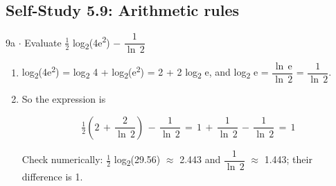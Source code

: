\documentclass[11pt]{article}
\begin{document}
\begin{keepsection}\subsection{Self-Study 5.9: Arithmetic rules}

\begin{workedbox}{9a \ensuremath{\cdot} Evaluate \ensuremath{\tfrac12} log\textsubscript{2}(4e\textsuperscript{2}) \ensuremath{-} {\small\ensuremath{\dfrac{1}{\ln \, 2}}}}
\begin{enumerate}
\item log\textsubscript{2}(4e\textsuperscript{2}) = log\textsubscript{2} 4 + log\textsubscript{2}(e\textsuperscript{2}) = 2 + 2 log\textsubscript{2} e, and log\textsubscript{2} e = {\small\ensuremath{\dfrac{\ln \, \mathrm{e}}{\ln \, 2}}} = {\small\ensuremath{\dfrac{1}{\ln \, 2}}}.
\item {}
So the expression is

\begin{equation*}\tfrac{1}{2}\left(2\, +\, \dfrac{2}{\ln \, 2}\right)\, -\, \dfrac{1}{\ln \, 2}\, =\, 1\, +\, \dfrac{1}{\ln \, 2}\, -\, \dfrac{1}{\ln \, 2}\, =\, 1\end{equation*}

Check numerically: \ensuremath{\tfrac12} log\textsubscript{2}(29.56) \ensuremath{\approx} 2.443 and {\small\ensuremath{\dfrac{1}{\ln \, 2}}} \ensuremath{\approx} 1.443; their difference is 1.
\end{enumerate}
\end{workedbox}

\end{keepsection}
\end{document}
